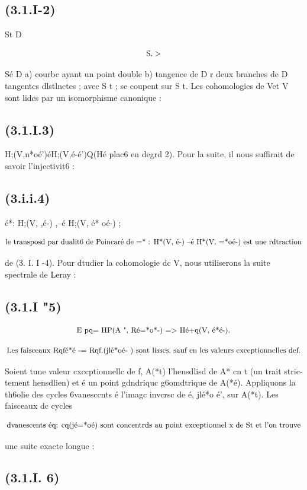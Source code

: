 \documentclass[11pt]{article}
\theoremstyle{remark}
\begin{document}
\subsection*{(3.1.I-2)}

St D

\[\text{\small S, >}\]

Sé D a) courbc ayant un point double b) tangence de D r deux branches de D tangentcs dlstlnctes ; avec S t ; se coupent sur S t. Les cohomologies de Vet V sont lidcs par un isomorphisme canonique :

\subsection*{(3.1.I.3)}

H;(V,n*oé')éH;(V,é-é')Q(Hé plac6 en degrd 2). Pour la suite, il nous suffirait de savoir l'injectivit6 :

\subsection*{(3.i.i.4)}

é*: H;(V, ,é-) ,--é H;(V, é* oé-) ;

\[\text{\small le transposd par dualit6 de Poincaré de =* : H*(V, é-) --é H*(V, =*oé-) est une rdtraction}\]

de (3. I. I -4). Pour dtudier la cohomologie dc V, nous utiliserons la suite spectrale de Leray :

\subsection*{(3.1.I "5)}

\[\text{\small E pq= HP(A ", Ré=*o*-) => Hé+q(V, é*é-).}\]

\[\text{\small Les faisceaux Rqfé*é -= Rqf.(jlé*oé- ) sont lisscs, sauf en lcs valeurs cxceptionnclles def.}\]

Soient tune valeur cxccptionnellc de f, A(*t) l'hensdlisd de A* cn t (un trait stric- tement hensdlien) et é un point gdndriquc g6omdtrique de A(*é). Appliquons la th6olie des cycles 6vanesccnts é l'imagc invcrsc de é, jlé*o é', sur A(*t). Les faisceaux dc cycles

\[\text{\small dvanescents éq: cq(jé=*oé) sont concentrds au point exceptionnel x de St et l'on trouve}\]

une suite exacte longue :

\subsection*{(3.1.I. 6)}
\end{document}
